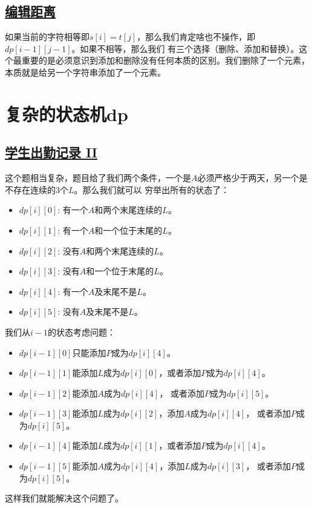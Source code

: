 \documentclass[../../main.tex]{subfiles}
\begin{document}
\subsection{\href{https://leetcode.cn/problems/edit-distance/}{编辑距离}}

如果当前的字符相等即$s[i] = t[j]$，那么我们肯定啥也不操作，即$dp[i - 1][j -1]$。如果不相等，那么我们
有三个选择（删除、添加和替换）。这个最重要的是必须意识到添加和删除没有任何本质的区别。我们删除了一个元素，
本质就是给另一个字符串添加了一个元素。

\section{复杂的状态机dp}

\subsection{\href{https://leetcode.cn/problems/student-attendance-record-ii/}{学生出勤记录 II}}

这个题相当复杂，题目给了我们两个条件，一个是$A$必须严格少于两天，另一个是不存在连续的3个$L$。那么我们就可以
穷举出所有的状态了：

\begin{itemize}
  \item $dp[i][0]$: 有一个$A$和两个末尾连续的$L$。
  \item $dp[i][1]$: 有一个$A$和一个位于末尾的$L$。
  \item $dp[i][2]$: 没有$A$和两个末尾连续的$L$。
  \item $dp[i][3]$: 没有$A$和一个位于末尾的$L$。
  \item $dp[i][4]$: 有一个$A$及末尾不是$L$。
  \item $dp[i][5]$: 没有$A$及末尾不是$L$。
\end{itemize}

我们从$i - 1$的状态考虑问题：

\begin{itemize}
  \item $dp[i-1][0]$只能添加$P$成为$dp[i][4]$。
  \item $dp[i-1][1]$能添加$L$成为$dp[i][0]$，或者添加$P$成为$dp[i][4]$。
  \item $dp[i-1][2]$能添加$A$成为$dp[i][4]$， 或者添加$P$成为$dp[i][5]$。
  \item $dp[i-1][3]$能添加$L$成为$dp[i][2]$，添加$A$成为$dp[i][4]$，
  或者添加$P$成为$dp[i][5]$。
  \item $dp[i-1][4]$能添加$L$成为$dp[i][1]$，或者添加$P$成为$dp[i][4]$。
  \item $dp[i-1][5]$能添加$A$成为$dp[i][4]$，添加$L$成为$dp[i][3]$，
  或者添加$P$成为$dp[i][5]$。
\end{itemize}

这样我们就能解决这个问题了。


\end{document}
